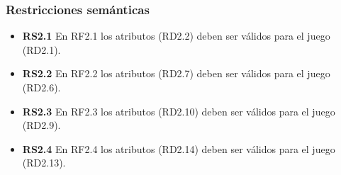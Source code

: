 \subsubsection{Restricciones semánticas}

\begin{itemize}
	\item \textbf{RS2.1} En RF2.1 los atributos (RD2.2) deben ser
		válidos para el juego (RD2.1).
	\item \textbf{RS2.2} En RF2.2 los atributos (RD2.7) deben ser
		válidos para el juego (RD2.6).
	\item \textbf{RS2.3} En RF2.3 los atributos (RD2.10) deben ser
		válidos para el juego (RD2.9).
	\item \textbf{RS2.4} En RF2.4 los atributos (RD2.14) deben ser
		válidos para el juego (RD2.13).

\end{itemize}
